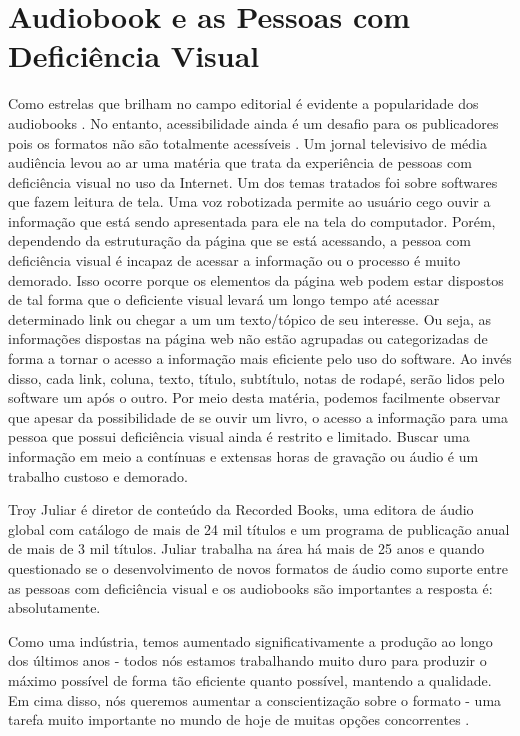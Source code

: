 \section{Audiobook e as Pessoas com Deficiência Visual}

Como estrelas que brilham no campo editorial é evidente a popularidade dos audiobooks \cite{printdisable}. No entanto, acessibilidade ainda é um desafio para os publicadores pois os formatos não são totalmente acessíveis \cite{challenge}. Um jornal televisivo de média audiência levou ao ar uma matéria que trata da experiência de pessoas com deficiência visual no uso da Internet. Um dos temas tratados foi sobre softwares que fazem leitura de tela. Uma voz robotizada permite ao usuário cego ouvir a informação que está sendo apresentada para ele na tela do computador. Porém, dependendo da estruturação da página que se está acessando, a pessoa com deficiência visual é incapaz de acessar a informação ou o processo é muito demorado. Isso ocorre porque os elementos da página web podem estar dispostos de tal forma que o deficiente visual levará um longo tempo até acessar determinado link ou chegar a um  um texto/tópico de seu interesse. Ou seja, as informações dispostas na página web não estão agrupadas ou categorizadas de forma a tornar o acesso a informação mais eficiente pelo uso do software. Ao invés disso, cada link, coluna, texto, título, subtítulo, notas de rodapé, serão lidos pelo software um após o outro. Por meio desta matéria, podemos facilmente observar que apesar da possibilidade de se ouvir um livro, o acesso a informação para uma pessoa que possui deficiência visual ainda é restrito e limitado. Buscar uma informação em meio a contínuas e extensas horas de gravação ou áudio é um trabalho custoso e demorado.

Troy Juliar é diretor de conteúdo da Recorded Books, uma editora de áudio global com catálogo de mais de 24 mil títulos e um  programa de publicação anual de mais de 3 mil títulos. Juliar trabalha na área há mais de 25 anos e quando questionado se o desenvolvimento de novos formatos de áudio como suporte entre as pessoas com deficiência visual e os audiobooks são importantes a resposta é: absolutamente.

\begin{citacao}
Como uma indústria, temos aumentado significativamente a produção ao longo dos últimos anos - todos nós estamos trabalhando muito duro para produzir o máximo possível de forma tão eficiente quanto possível, mantendo a qualidade. Em cima disso, nós queremos aumentar a conscientização sobre o formato - uma tarefa muito importante no mundo de hoje de muitas opções concorrentes \cite{multitask}.
\end{citacao}

